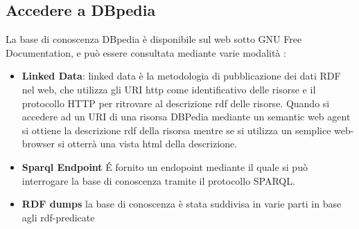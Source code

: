 \subsection{Accedere a DBpedia}
La base di conoscenza DBpedia è disponibile sul web sotto GNU Free Documentation, e può essere consultata mediante varie modalità :
\begin{itemize}
\item \textbf{Linked Data}: linked data è la metodologia di pubblicazione  dei dati RDF nel web, che utilizza gli URI http come identificativo delle risorse e il protocollo HTTP per ritrovare al descrizione rdf delle risorse. Quando si accedere ad un URI di una risorsa DBPedia mediante un semantic web agent si ottiene la descrizione rdf della risorsa mentre se si utilizza un semplice web-browser si otterrà una vista html della descrizione.
\item \textbf{Sparql Endpoint } \'E fornito un endopoint mediante il quale si può interrogare la base di conoscenza tramite il protocollo SPARQL.
\item \textbf{RDF dumps} la base di conoscenza è stata suddivisa in varie parti in base agli rdf-predicate 
\end{itemize}